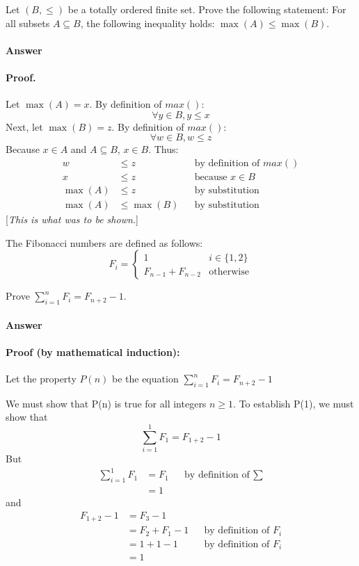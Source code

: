 \documentclass{article}
\begin{document}
Let $(B,\leq)$ be a totally ordered finite set. Prove the following
statement: For all subsets $A \subseteq B$, the following inequality
holds: $\max(A) \leq \max(B)$.

\paragraph{Answer}
\paragraph{Proof.}

Let $\max(A) = x$. By definition of $max()$: $$\forall y \in B, y \leq x$$ Next, let $\max(B) = z$. By definition of $max()$: $$\forall w \in B, w \leq z$$
Because $x \in A$ and $A \subseteq B$, $x \in B$. Thus:
\begin{align}
        \nonumber w &\leq z &&\text{by definition of $max()$}\\ \nonumber x &\leq z &&\text{because $x \in B$}\\ \nonumber \max(A) &\leq z &&\text{by substitution} \\ \nonumber \max(A) &\leq \max(B) &&\text{by substitution}
\end{align}
[\emph{This is what was to be shown.}]


\collab{} 

The Fibonacci numbers are defined as follows:
$$
    F_i = \begin{cases}
            1 & i \in \{1,2\} \\
            F_{n-1}+F_{n-2} & \text{otherwise}
          \end{cases}
$$

Prove $\sum_{i=1}^n F_i = F_{n+2}-1$.

\paragraph{Answer}
\paragraph{Proof (by mathematical induction):}

Let the property $P(n)$ be the equation $\sum_{i=1}^n F_i = F_{n+2}-1$

We must show that P(n) is true for all integers $n \geq 1$. To establish P(1), we must show that $$\sum_{i=1}^1 F_1 = F_{1+2}-1$$ But
\begin{align}
        \nonumber \sum_{i=1}^1 F_1 & = F_1 &&\text{by definition of $\sum$} \\ \nonumber & = 1
\end{align}
and
\begin{align}
        \nonumber F_{1+2}-1 & = F_3 - 1 \\ \nonumber &= F_2 + F_1 - 1 &&\text{by definition of $F_i$}\\ \nonumber & = 1 + 1 - 1 &&\text{by definition of $F_i$} \\ \nonumber &= 1
\end{align}
\end{document}
